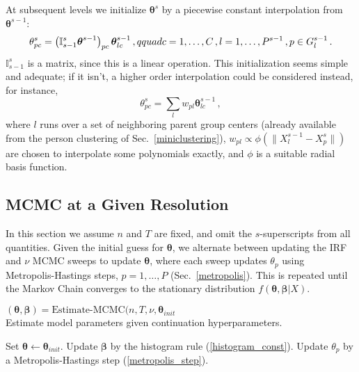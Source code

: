 \documentclass{article}
\newcommand{\bbeta}{\boldsymbol\beta}
\newcommand{\bta}{\boldsymbol\ta}
\newcommand{\ta}{\theta}
\newcommand{\lla}{\longleftarrow}
\newcommand{\I}{\mathbb{I}}
\begin{document}
At subsequent levels we initialize $\bta^s$ by a piecewise constant interpolation from $\bta^{s-1}$:
\begin{equation}
	\ta^s_{pc} = \left(\I_{s-1}^s \bta^{s-1}\right)_{pc} \bta^{s-1}_{lc}\,,\\qquad c=1,\dots,C\,, l=1,\dots,P^{s-1}\,,p \in G^{s-1}_l\,.
\end{equation}
$\I_{s-1}^s$ is a matrix, since this is a linear operation. This initialization seems simple and adequate; if it isn't, a higher order interpolation could be considered instead, for instance,
\begin{equation}
	\ta^s_{pc} = \sum_l w_{pl} \bta^{s-1}_{lc}\,,
\end{equation}
where $l$ runs over a set of neighboring parent group centers (already available from the person clustering of Sec.~\ref{miniclustering}), $w_{pl} \propto \phi(\|X^{s-1}_l-X^s_p\|)$ are chosen to interpolate some polynomials exactly, and $\phi$ is a suitable radial basis function.

\subsection{MCMC at a Given Resolution}
In this section we assume $n$ and $T$ are fixed, and omit the $s$-superscripts from all quantities. Given the initial guess for $\bta$, we alternate between updating the IRF and $\nu$ MCMC sweeps to update $\bta$, where each sweep updates $\ta_p$ using Metropolis-Hastings steps, $p=1,\dots,P$ (Sec.~\ref{metropolis}). This is repeated until the Markov Chain converges to the stationary distribution $f(\bta,\bbeta|X)$.

\begin{algorithm}
\caption[]{$(\bta, \bbeta) = {\mbox{Estimate-MCMC}}(n, T, \nu, \bta_{init}$\\\hspace{\textwidth}
Estimate model parameters given continuation hyperparameters.}
\label{mcmc}
\begin{algorithmic}
    \STATE Set $\bta \lla \bta_{init}$.
    	\STATE Update $\bbeta$ by the histogram rule (\ref{histogram_const}).
	    		\STATE Update $\theta_p$ by a Metropolis-Hastings step (\ref{metropolis_step}).
	    	\ENDFOR
    	\ENDFOR
    \ENDWHILE
\end{algorithmic}
\end{algorithm}
\end{document}
